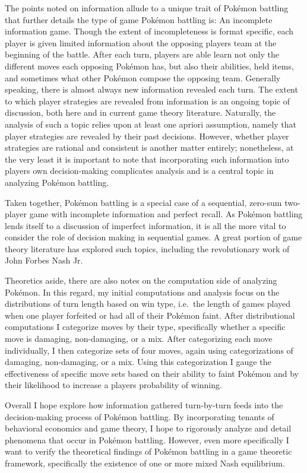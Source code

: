 \documentclass[12pt,twoside]{reedthesis}
\begin{document}
  The points noted on information allude to a unique trait of Pokémon
  battling that further details the type of game Pokémon battling is: An
  incomplete information game. Though the extent of incompleteness is
  format specific, each player is given limited information about the
  opposing players team at the beginning of the battle. After each turn,
  players are able learn not only the different moves each opposing
  Pokémon has, but also their abilities, held items, and sometimes what
  other Pokémon compose the opposing team. Generally speaking, there is
  almost always new information revealed each turn. The extent to which
  player strategies are revealed from information is an ongoing topic of
  discussion, both here and in current game theory literature. Naturally,
  the analysis of such a topic relies upon at least one apriori
  assumption, namely that player strategies are revealed by their past
  decisions. However, whether player strategies are rational and
  consistent is another matter entirely; nonetheless, at the very least it
  is important to note that incorporating such information into players
  own decision-making complicates analysis and is a central topic in
  analyzing Pokémon battling.
  
  Taken together, Pokémon battling is a special case of a sequential,
  zero-sum two-player game with incomplete information and perfect recall.
  As Pokémon battling lends itself to a discussion of imperfect
  information, it is all the more vital to consider the role of decision
  making in sequential games. A great portion of game theory literature
  has explored such topics, including the revolutionary work of John
  Forbes Nash Jr.
  
  Theoretics aside, there are also notes on the computation side of
  analyzing Pokémon. In this regard, my initial computations and analysis
  focus on the distributions of turn length based on win type, i.e.~the
  length of games played when one player forfeited or had all of their
  Pokémon faint. After distributional computations I categorize moves by
  their type, specifically whether a specific move is damaging,
  non-damaging, or a mix. After categorizing each move individually, I
  then categorize sets of four moves, again using categorizations of
  damaging, non-damaging, or a mix. Using this categorization I gauge the
  effectiveness of specific move sets based on their ability to faint
  Pokémon and by their likelihood to increase a players probability of
  winning.
  
  Overall I hope explore how information gathered turn-by-turn feeds into
  the decision-making process of Pokémon battling. By incorporating
  tenants of behavioral economics and game theory, I hope to rigorously
  analyze and detail phenomena that occur in Pokémon battling. However,
  even more specifically I want to verify the theoretical findings of
  Pokémon battling in a game theoretic framework, specifically the
  existence of one or more mixed Nash equilibrium.
  
\end{document}
